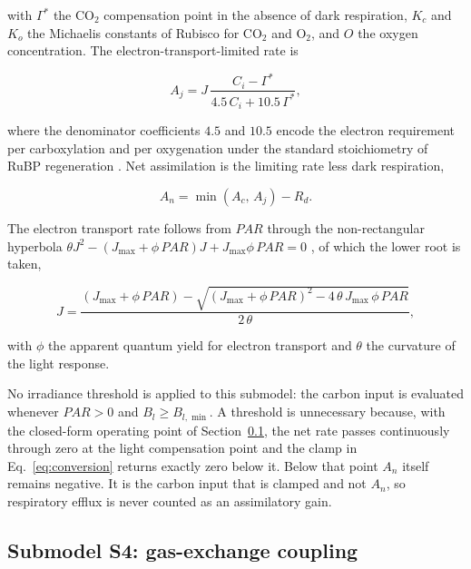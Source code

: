 with $\Gamma^{*}$ the CO$_2$ compensation point in the absence of dark
respiration, $K_c$ and $K_o$ the Michaelis constants of Rubisco for CO$_2$ and
O$_2$, and $O$ the oxygen concentration. The electron-transport-limited rate is

\begin{equation}
A_j = J\,\frac{C_i - \Gamma^{*}}{4.5\,C_i + 10.5\,\Gamma^{*}},
\label{eq:Aj}
\end{equation}

where the denominator coefficients $4.5$ and $10.5$ encode the electron
requirement per carboxylation and per oxygenation under the standard
stoichiometry of RuBP regeneration
\citep{vonCaemmerer1981,vonCaemmerer2000}. Net assimilation is the limiting
rate less dark respiration,

\begin{equation}
A_n = \min(A_c,\,A_j) - R_d .
\label{eq:An}
\end{equation}

The electron transport rate follows from $\mathit{PAR}$ through the
non-rectangular hyperbola
$\theta J^2 - (J_{\max} + \phi\,\mathit{PAR})J + J_{\max}\phi\,\mathit{PAR} = 0$
\citep{Farquhar1980,Farquhar1984}, of which the lower root is taken,

\begin{equation}
J = \frac{\left(J_{\max}+\phi\,\mathit{PAR}\right)
- \sqrt{\left(J_{\max}+\phi\,\mathit{PAR}\right)^{2}
- 4\,\theta\,J_{\max}\,\phi\,\mathit{PAR}}}{2\,\theta},
\label{eq:J_root}
\end{equation}

with $\phi$ the apparent quantum yield for electron transport and $\theta$ the
curvature of the light response.

No irradiance threshold is applied to this submodel: the carbon input is evaluated
whenever $\mathit{PAR} > 0$ and $B_l \geq B_{l,\min}$. A threshold is unnecessary
because, with the closed-form operating point of Section~\ref{sec:closure}, the net
rate passes continuously through zero at the light compensation point and the clamp
in Eq.~\eqref{eq:conversion} returns exactly zero below it. Below that point $A_n$
itself remains negative. It is the carbon input that is clamped and not $A_n$, so
respiratory efflux is never counted as an assimilatory gain.

\subsection{Submodel S4: gas-exchange coupling}
\label{sec:closure}

